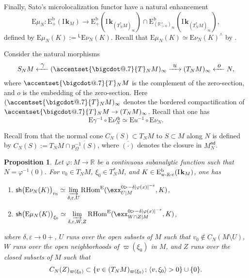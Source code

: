 \documentclass[JEP,XML,SOM,Unicode]{cedram}
\makeatletter
\newcommand{\To}[1][]{\mathchoice{\xrightarrow{\textstyle\kern4pt#1\kern3pt}}{\stackrel{#1}{\longrightarrow}}{}{}}
\newcommand\From[1][]{\mathchoice{\xleftarrow{\textstyle~#1~}}{\stackrel{#1}{\longleftarrow}}{}{}}
\newenvironment{enumeratei}
{\bgroup\def\theenumi{\roman{enumi}}\def\theenumii{\alph{enumii}}\begin{enumerate}}
{\end{enumerate}\egroup}
\newcommand*\bigcdot{\mathpalette\bigcdot@{.7}}
\newcommand*\bigcdot@[2]{\mathbin{\vcenter{\hbox{\scalebox{#2}{$\m@th#1\bullet$}}}}}
\newcommand{\bdot}[1]{{\accentset{\bigcdot}{#1}}\vphantom{#1}}
\newcommand{\semicolon}{\nobreak \mskip2mu\mathpunct{}\nonscript\mkern-\thinmuskip{;}\mskip6mu plus1mu\relax}
\newcommand{\bl}{\bigl(}
\newcommand{\br}{\bigr)}
\theoremstyle{plain}
\newtheorem{proposition}[theorem]{Proposition}
\theoremstyle{definition}
\newcommand{\R}{\mathbb{R}}
\newcommand{\derived}[1]{\mathrm{#1}}
\newcommand{\dere}{\derived{E}}\let\enh\dere
\newcommand{\derr}{\derived{R}}
\newcommand{\BECcon}[2][\ifield]{\dere^{\mathrm{b}}_{\bGmp}(#1_{#2})}
\newcommand{\BECp}[2][\ifield]{\dere^{\mathrm{b}}_+(#1_{#2})}
\newcommand{\BECwRc}[2][\ifield]{\dere^{\mathrm{b}}_\wRc(#1_{#2})}
\newcommand{\RHom}[1][]{\derr\mathrm{Hom}_{\raise1.5ex\hbox to.1em{}#1}}
\newcommand{\FHom}{\RHom^\enh}
\newcommand{\Eopb}[1]{\enh#1^{-1}}
\newcommand{\Emu}{\enh\mu}
\newcommand{\Enu}{\enh\nu}
\newcommand{\wRc}{{\mathrm{w}\text-\R\text-\mathrm{c}}}
\newcommand{\field}{\mathbf{k}}\let\cor\field
\newcommand{\ind}{\mathrm{I}\mspace{2mu}}
\newcommand{\ifield}{\ind\field}
\newcommand{\inbordered}[1]{{#1_\infty}}
\let\inb \inbordered
\newcommand{\range}[2]{#1 \mathbin{\rhd} #2}
\newcommand{\nd}{\mathsf{nd}}
\newcommand{\rb}{\mathsf{rb}}
\newcommand{\sh}{\mathsf{sh}}
\newcommand{\Gmp}{\R^\times_{>0}}
\newcommand{\bGmp}{\inbordered{(\Gmp)}}
\newcommand{\Lap}{\mathsf{L}}
\newcommand{\lap}{{}^\Lap}
\newcommand{\ND}[2][N]{#2_{#1}^{\nd}}
\newcommand{\defeq}{\mathbin{:=}}\let \seteq\defeq
\newcommand{\ilim}[1][]{\mathop{\varinjlim}\limits_{#1}}
\newcommand{\opb}[1]{#1^{-1}}
\makeatother
\begin{document}
Finally, Sato's microlocalization functor have a natural enhancement
\[
\Emu_N \colon \BECp M \to \BECp{\inb{(T^*_NM)}}\cap \BECcon{\inb{(T^*_NM)}},
\]
defined by $\Emu_N(K) \defeq \lap\Enu_N(K)$. Recall that $\Emu_N(K) \simeq \Enu_N(K)^\wedge$ by \cite[Prop.\,5.3]{DK19nu}.

Consider the natural morphisms
\[
S_NM \From[\gamma] \inb{(\bdot T_NM)} \To[u] \inb{(T_NM)} \From[o] N,
\]
where $\bdot T_NM$ is the complement of the zero-section, and $o$ is the embedding of the zero-section.
Here $\inb{(\bdot T_NM)}$ denotes the bordered compactification of $\bdot T_NM\to\inb{(T_NM)}$.
Recall that one has
\[
\Eopb\gamma \circ \Enu_N^\rb \simeq \Eopb u \circ \Enu_N.
\]

Recall from \cite[\S4.1]{KS90} that the normal cone $C_N(S)\subset T_NM$ to $S\subset M$ along $N$ is defined by $C_N(S) \defeq T_NM\cap\overline{\opb{p_\Omega}(S)}$,
where $\overline{(\cdot)}$ denotes the closure in $\ND M$.

\begin{proposition}\label{pro:numugerm}
Let $\varphi\colon M\to \R$ be a continuous subanalytic function such that
$N = \varphi^{-1}(0)$.
For $v_0\in T_NM$, $\xi_0\in T^*_NM$, and $K\in\BECwRc M$, one has
\begin{enumeratei}
\item
\label{pro:numugermi}
$\sh\bl\Enu_N(K)\br_{v_0} \simeq
\ilim[\delta,\varepsilon,U]
\FHom( \exx^{\range0{-\delta|\varphi(x)|^{-\varepsilon}}}_{U|M} , K)$,
\item
\label{pro:numugermii}
$\sh\bl\Emu_N(K)\br_{\xi_0} \simeq
\ilim[\delta,\varepsilon, W, Z]
\FHom(\exx^{\range0{-\delta|\varphi(x)|^{-\varepsilon}}}_{W\cap Z|M} , K)$,
\end{enumeratei}
\noindent
where $\delta,\varepsilon\to0+$, $U$ runs over the open subsets of $M$ such that $v_0\notin C_N(M\setminus U)$, $W$ runs over the open neighborhoods of $\varpi(\xi_0)$ in $M$, and
$Z$ runs over the closed subsets of $M$ such that
\[
C_N(Z)_{\varpi(\xi_0)}\subset\{v\in(T_NM)_{\varpi(\xi_0)}\semicolon \langle v,\xi_0\rangle>0\}\cup\{0\}.
\]
\end{proposition}
\end{document}
